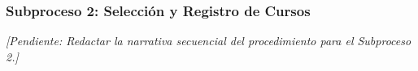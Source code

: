 \subsubsection{Subproceso 2: Selección y Registro de Cursos}

\textit{[Pendiente: Redactar la narrativa secuencial del procedimiento para el Subproceso 2.]}

